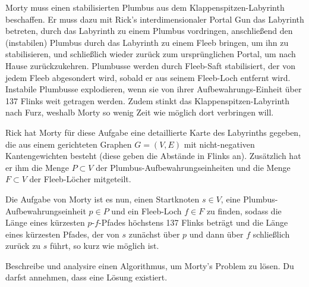 \documentclass{uebung_cs}
\begin{document}
\begin{aufgabe}
    Morty muss einen stabilisierten Plumbus aus dem Klappenspitzen-Labyrinth beschaffen.
    Er muss dazu mit Rick's interdimensionaler Portal Gun das Labyrinth betreten, durch das Labyrinth zu einem Plumbus vordringen, anschließend den (instabilen) Plumbus durch das Labyrinth zu einem Fleeb bringen, um ihn zu stabilisieren, und schließlich wieder zurück zum ursprünglichen Portal, um nach Hause zurückzukehren.
    Plumbusse werden durch Fleeb-Saft stabilisiert, der von jedem Fleeb abgesondert wird, sobald er aus seinem Fleeb-Loch entfernt wird.
    Instabile Plumbusse explodieren, wenn sie von ihrer Aufbewahrungs-Einheit über 137 Flinks weit getragen werden.
    Zudem stinkt das Klappenspitzen-Labyrinth nach Furz, weshalb Morty so wenig Zeit wie möglich dort verbringen will.

    Rick hat Morty für diese Aufgabe eine detaillierte Karte des Labyrinths gegeben, die aus einem gerichteten Graphen $G = (V,E)$ mit nicht-negativen Kantengewichten besteht (diese geben die Abstände in Flinks an).
    Zusätzlich hat er ihm die Menge $P \subset V$ der Plumbus-Aufbewahrungseinheiten und die Menge $F \subset V$ der Fleeb-Löcher mitgeteilt.
    
    Die Aufgabe von Morty ist es nun, einen Startknoten $s \in V$, eine Plumbus-Aufbewahrungseinheit $p \in P$ und ein Fleeb-Loch $f \in F$ zu finden, sodass die Länge eines kürzesten $p$-$f$-Pfades höchstens 137 Flinks beträgt und die Länge eines kürzesten Pfades, der von $s$ zunächst über $p$ und dann über $f$ schließlich zurück zu $s$ führt, so kurz wie möglich ist.

    Beschreibe und analysire einen Algorithmus, um Morty's Problem zu lösen.
    Du darfst annehmen, dass eine Lösung existiert.
\end{aufgabe}
\end{document}
